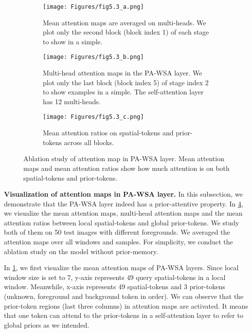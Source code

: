 \documentclass[10pt,twocolumn,letterpaper]{article}
\begin{document}
\begin{figure}[t]
  \centering
  \begin{subfigure}{1.0\linewidth}
    \centering
    \texttt{[image: Figures/fig5.3\_a.png]}
    \vspace{-2mm}
    \caption{Mean attention maps are averaged on multi-heads. We plot only the second block (block index 1) of each stage to show in a simple.}
    \label{fig:attn_a}
  \end{subfigure}  \hfill
  
  \begin{subfigure}{1.0\linewidth}
    \centering
    \texttt{[image: Figures/fig5.3\_b.png]}      
    \vspace{-2mm}
    \caption{Multi-head attention maps in the PA-WSA layer. We plot only the last block (block index 5) of stage index 2 to show examples in a simple. The self-attention layer has 12 multi-heads. }
    \label{fig:attn_b}
  \end{subfigure}  \hfill
  
  \begin{subfigure}{1.0\linewidth}
    \centering
    \texttt{[image: Figures/fig5.3\_c.png]}      
    \caption{Mean attention ratios on spatial-tokens and prior-tokens across all blocks.}
    \label{fig:attn_c}
  \end{subfigure}  \hfill
  
  \caption{Ablation study of attention map in PA-WSA layer. Mean attention maps and mean attention ratios show how much attention is on both spatial-tokens and prior-tokens.}
  \label{fig:attn}
  \vspace{-2mm}
\end{figure}

\vspace{2mm}
\textbf{Visualization of attention maps in PA-WSA layer. }
In this subsection, we demonstrate that the PA-WSA layer indeed has a prior-attentive property. In \cref{fig:attn}, we visualize the mean attention maps, multi-head attention maps and the mean attention ratios between local spatial-tokens and global prior-tokens. We study both of them on 50 test images with different foregrounds. We averaged the attention maps over all windows and samples. For simplicity, we conduct the ablation study on the model without prior-memory.

In \cref{fig:attn_a}, we first visualize the mean attention maps of PA-WSA layers. Since local window size is set to 7, y-axis represents 49 query spatial-tokens in a local window. Meanwhile, x-axis represents 49 spatial-tokens and 3 prior-tokens (unknown, foreground and background token in order). We can observe that the prior-token regions (last three columns) in attention maps are activated. It means that one token can attend to the prior-tokens in a self-attention layer to refer to global priors as we intended.
\end{document}
